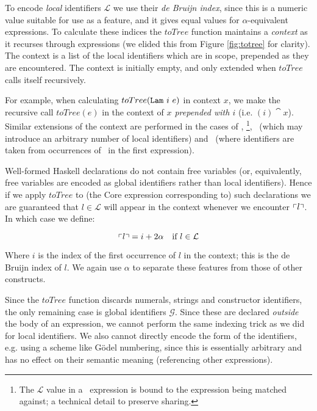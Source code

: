 To encode \emph{local} identifiers $\mathcal{L}$ we use their \emph{de Bruijn index}, since this is a numeric value suitable for use as a feature, and it gives equal values for $\alpha$-equivalent expressions. \iffalse TODO: needs to be defined within the text to make formal sense. Maybe don't mention it here, but just say, once it's defined, that it's known as the de Bruijn index? \fi To calculate these indices the $toTree$ function maintains a \emph{context} as it recurses through expressions (we elided this from Figure \ref{fig:totree} for clarity). The context is a list of the local identifiers which are in scope, prepended as they are encountered. The context is initially empty, and only extended when $toTree$ calls itself recursively.

For example, when calculating $toTree(\texttt{Lam}\ i\ e)$ in context $x$, we make the recursive call $toTree(e)$ in the context of \emph{$x$ prepended with $i$} (i.e. $(i) \cat x$). Similar extensions of the context are performed in the cases of \CBind, \CCase\footnote{The $\mathcal{L}$ value in a \CCase\ expression is bound to the expression being matched against; a technical detail to preserve sharing.}, \CAlt\ (which may introduce an arbitrary number of local identifiers) and \CLet\ (where identifiers are taken from occurrences of \CBind\ in the first expression).

Well-formed Haskell declarations do not contain free variables (or, equivalently, free variables are encoded as global identifiers rather than local identifiers). Hence if we apply $toTree$ to (the Core expression corresponding to) such declarations we are guaranteed that $l \in \mathcal{L}$ will appear in the context whenever we encounter $\left\ulcorner l \right\urcorner$. \iffalse NOTE: Can we prove this, or would it just be an exercise in formalising Haskell? \fi In which case we define:

\begin{equation}
  \left\ulcorner l \right\urcorner = i + 2 \alpha \quad \text{if $l \in \mathcal{L}$}
\end{equation}

Where $i$ is the index of the first occurrence of $l$ in the context; this is the de Bruijn index of $l$. We again use $\alpha$ to separate these features from those of other constructs.

Since the $toTree$ function discards numerals, strings and constructor identifiers, the only remaining case is global identifiers $\mathcal{G}$. Since these are declared \emph{outside} the body of an expression, we cannot perform the same indexing trick as we did for local identifiers. We also cannot directly encode the form of the identifiers, e.g. using a scheme like G{\"o}del numbering, since this is essentially arbitrary and has no effect on their semantic meaning (referencing other expressions).

